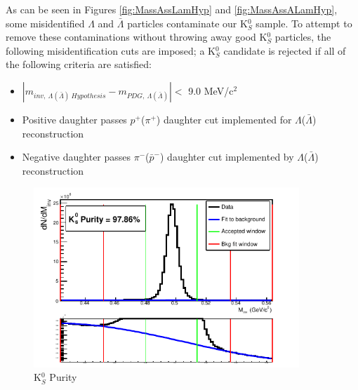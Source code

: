\documentclass[../AnalysisNoteJBuxton.tex]{subfiles}
\begin{document}
As can be seen in Figures \ref{fig:MassAssLamHyp} and \ref{fig:MassAssALamHyp}, some misidentified $\Lambda$ and $\bar{\Lambda}$ particles contaminate our K$^{0}_{S}$ sample.  To attempt to remove these contaminations without throwing away good K$^{0}_{S}$ particles, the following misidentification cuts are imposed; a K$^{0}_{S}$ candidate is rejected if all of the following criteria are satisfied:
\begin{itemize}
 \item $|m_{inv, \ \Lambda(\bar{\Lambda}) \ Hypothesis} - m_{PDG,\ \Lambda(\bar{\Lambda})}| < $ 9.0 MeV/c$^{2}$
 \item Positive daughter passes $p^{+}$($\pi^{+}$) daughter cut implemented for $\Lambda$($\bar{\Lambda}$) reconstruction
 \item Negative daughter passes $\pi^{-}$($\bar{p}^{-}$) daughter cut implemented by $\Lambda$($\bar{\Lambda}$) reconstruction
\end{itemize} 


\begin{figure}[h]
  \centering
  \includegraphics[width=100mm]{3_DataSelection/Figures/K0Purity_LamK0.pdf}
  \caption[K$^{0}_{S}$ Purity]{K$^{0}_{S}$ Purity}
  \label{fig:K0Purity}
\end{figure}
\end{document}
